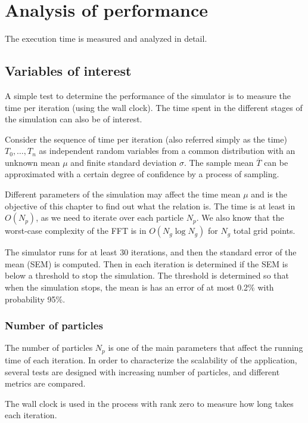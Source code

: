 \chapter{Analysis of performance}

The execution time is measured and analyzed in detail.

\section{Variables of interest}

A simple test to determine the performance of the simulator is to measure the
time per iteration (using the wall clock). The time spent in the different
stages of the simulation can also be of interest.

Consider the sequence of time per iteration (also referred simply as the time)
$T_0,\ldots,T_n$ as independent random variables from a common distribution with
an unknown mean $\mu$ and finite standard deviation $\sigma$. The sample mean
$\overline T$ can be approximated with a certain degree of confidence by a
process of sampling.

Different parameters of the simulation may affect the time mean $\mu$ and is the
objective of this chapter to find out what the relation is. The time is at least
in $O(N_p)$, as we need to iterate over each particle $N_p$. We also know that
the worst-case complexity of the FFT is in $O(N_g \log N_g)$ for $N_g$ total grid
points.

The simulator runs for at least 30 iterations, and then the standard error of 
the mean (SEM) is computed. Then in each iteration is determined if the SEM is 
below a threshold to stop the simulation. The threshold is determined so that 
when the simulation stops, the mean is has an error of at most 0.2\% with 
probability 95\%.

\subsection{Number of particles}

The number of particles $N_p$ is one of the main parameters that affect the
running time of each iteration. In order to characterize the scalability of the
application, several tests are designed with increasing number of particles, and
different metrics are compared.

The wall clock is used in the process with rank zero to measure how long takes
each iteration.


